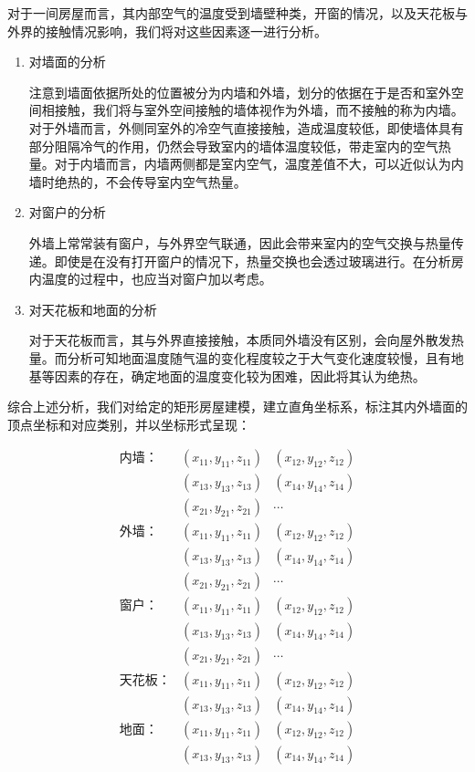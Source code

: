 \documentclass{my_paper}
\begin{document}
对于一间房屋而言，其内部空气的温度受到墙壁种类，开窗的情况，以及天花板与外界的接触情况影响，我们将对这些因素逐一进行分析。
\begin{enumerate}
    \item 对墙面的分析
    
    注意到墙面依据所处的位置被分为内墙和外墙\cite{3}，划分的依据在于是否和室外空间相接触，我们将与室外空间接触的墙体视作为外墙，而不接触的称为内墙。对于外墙而言，外侧同室外的冷空气直接接触，造成温度较低，即使墙体具有部分阻隔冷气的作用，仍然会导致室内的墙体温度较低，带走室内的空气热量。对于内墙而言，内墙两侧都是室内空气，温度差值不大，可以近似认为内墙时绝热的，不会传导室内空气热量。
    \item 对窗户的分析
    
    外墙上常常装有窗户，与外界空气联通，因此会带来室内的空气交换与热量传递。即使是在没有打开窗户的情况下，热量交换也会透过玻璃进行。在分析房内温度的过程中，也应当对窗户加以考虑。
    \item 对天花板和地面的分析
    
    对于天花板而言，其与外界直接接触，本质同外墙没有区别，会向屋外散发热量。而分析可知地面温度随气温的变化程度较之于大气变化速度较慢，且有地基等因素的存在，确定地面的温度变化较为困难，因此将其认为绝热。
    

\end{enumerate}

综合上述分析，我们对给定的矩形房屋建模，建立直角坐标系，标注其内外墙面的顶点坐标和对应类别，并以坐标形式呈现：

\begin{equation}
    \begin{aligned}
        \text{内墙：}&(x_{11},y_{11},z_{11})&(x_{12},y_{12},z_{12})\\
                    &(x_{13},y_{13},z_{13})&(x_{14},y_{14},z_{14})\\
                    &(x_{21},y_{21},z_{21})&\cdots \\
        \text{外墙：}&(x_{11},y_{11},z_{11})&(x_{12},y_{12},z_{12})\\
        &(x_{13},y_{13},z_{13})&(x_{14},y_{14},z_{14})\\
        &(x_{21},y_{21},z_{21})&\cdots \\
        \text{窗户：}&(x_{11},y_{11},z_{11})&(x_{12},y_{12},z_{12})\\
        &(x_{13},y_{13},z_{13})&(x_{14},y_{14},z_{14})\\
        &(x_{21},y_{21},z_{21})&\cdots \\
        \text{天花板：}&(x_{11},y_{11},z_{11})&(x_{12},y_{12},z_{12})\\
        &(x_{13},y_{13},z_{13})&(x_{14},y_{14},z_{14})\\
        \text{地面：}&(x_{11},y_{11},z_{11})&(x_{12},y_{12},z_{12})\\
        &(x_{13},y_{13},z_{13})&(x_{14},y_{14},z_{14})\\
    \end{aligned}
    \label{fw}
\end{equation}
\end{document}
